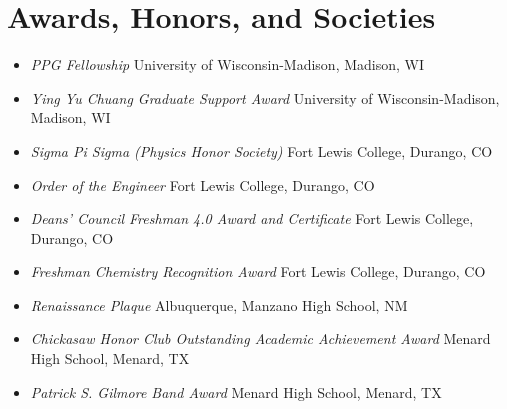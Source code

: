 \section{Awards, Honors, and Societies}

\begin{itemize}[noitemsep,topsep=0pt]
    \item \textit{PPG Fellowship} \hfill University of Wisconsin-Madison, Madison, WI
    \item \textit{Ying Yu Chuang Graduate Support Award} \hfill University of Wisconsin-Madison, Madison, WI
    \item \textit{Sigma Pi Sigma (Physics Honor Society)} \hfill Fort Lewis College, Durango, CO
    \item \textit{Order of the Engineer} \hfill Fort Lewis College, Durango, CO
    \item \textit{Deans' Council Freshman 4.0 Award and Certificate} \hfill Fort Lewis College, Durango, CO
    \item \textit{Freshman Chemistry Recognition Award} \hfill Fort Lewis College, Durango, CO
    \item \textit{Renaissance Plaque} \hfill Albuquerque, Manzano High School, NM
    \item \textit{Chickasaw Honor Club Outstanding Academic Achievement Award} \hfill Menard High School, Menard, TX
    \item \textit{Patrick S. Gilmore Band Award} \hfill Menard High School, Menard, TX
\end{itemize}
